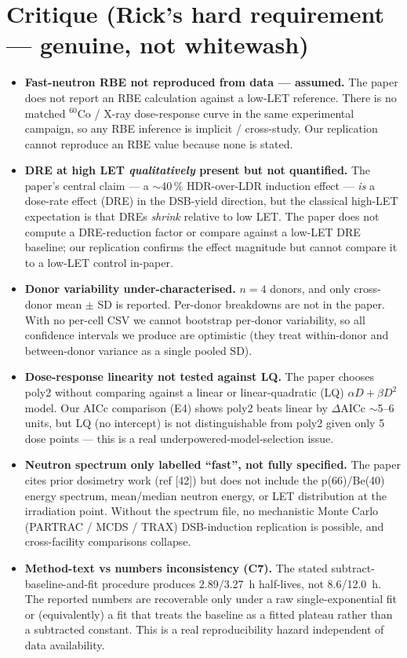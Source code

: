\documentclass[11pt]{article}
\begin{document}
\section{Critique (Rick's hard requirement --- genuine, not whitewash)}
\begin{itemize}
  \item \textbf{Fast-neutron RBE not reproduced from data --- assumed.} The paper
        does not report an RBE calculation against a low-LET reference. There is
        no matched $^{60}$Co / X-ray dose-response curve in the same experimental
        campaign, so any RBE inference is implicit / cross-study. Our
        replication cannot reproduce an RBE value because none is stated.
  \item \textbf{DRE at high LET \emph{qualitatively} present but not quantified.} The
        paper's central claim --- a $\sim$40\,\% HDR-over-LDR induction effect ---
        \emph{is} a dose-rate effect (DRE) in the DSB-yield direction, but the
        classical high-LET expectation is that DREs \emph{shrink} relative to low
        LET. The paper does not compute a DRE-reduction factor or compare
        against a low-LET DRE baseline; our replication confirms the effect
        magnitude but cannot compare it to a low-LET control in-paper.
  \item \textbf{Donor variability under-characterised.} $n=4$ donors, and only
        cross-donor mean $\pm$ SD is reported. Per-donor breakdowns are not in
        the paper. With no per-cell CSV we cannot bootstrap per-donor
        variability, so all confidence intervals we produce are optimistic
        (they treat within-donor and between-donor variance as a single pooled
        SD).
  \item \textbf{Dose-response linearity not tested against LQ.} The paper
        chooses poly2 without comparing against a linear or linear-quadratic
        (LQ) $\alpha D + \beta D^2$ model. Our AICc comparison (E4) shows poly2
        beats linear by $\Delta$AICc $\sim$5--6 units, but LQ (no intercept)
        is not distinguishable from poly2 given only 5 dose points --- this
        is a real underpowered-model-selection issue.
  \item \textbf{Neutron spectrum only labelled ``fast'', not fully specified.}
        The paper cites prior dosimetry work (ref [42]) but does not include
        the p(66)/Be(40) energy spectrum, mean/median neutron energy, or LET
        distribution at the irradiation point. Without the spectrum file,
        no mechanistic Monte Carlo (PARTRAC / MCDS / TRAX) DSB-induction
        replication is possible, and cross-facility comparisons collapse.
  \item \textbf{Method-text vs numbers inconsistency (C7).} The stated
        subtract-baseline-and-fit procedure produces 2.89/3.27~h half-lives,
        not 8.6/12.0~h. The reported numbers are recoverable only under a raw
        single-exponential fit or (equivalently) a fit that treats the
        baseline as a fitted plateau rather than a subtracted constant. This
        is a real reproducibility hazard independent of data availability.
\end{itemize}
\end{document}
